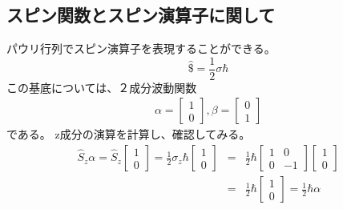 \documentclass[10pt]{jreport}
\begin{document}
\subsection*{スピン関数とスピン演算子に関して}
パウリ行列でスピン演算子を表現することができる。
\begin{equation}
\hat{\$} = \frac{1}{2}\sigma \hbar
\end{equation}
この基底については、２成分波動関数
\begin{eqnarray}
\alpha = \left [
\begin{array}{r}
1 \\
0 
\end{array}
\right ], \beta = \left [
\begin{array}{r}
0 \\
1
\end{array}
\right ]
\end{eqnarray}
である。
z成分の演算を計算し、確認してみる。
\begin{eqnarray}
\hat{S}_z \alpha = \hat{S}_z \left[
\begin{array}{r}
1 \\
0 
\end{array}
\right ] = \frac{1}{2} \sigma_z \hbar \left[
\begin{array}{r}
1 \\
0 
\end{array}
\right ] &=&\frac{1}{2}\hbar \left[
\begin{array}{rr}
1 & 0 \\
0 & -1 
\end{array}
\right ] \left [
\begin{array}{r}
1 \\
0 
\end{array}
\right ] \nonumber \\
&=& \frac{1}{2}\hbar \left [
\begin{array}{r}
1 \\
0 
\end{array}
\right ]  = \frac{1}{2}\hbar \alpha
\end{eqnarray}
\end{document}
